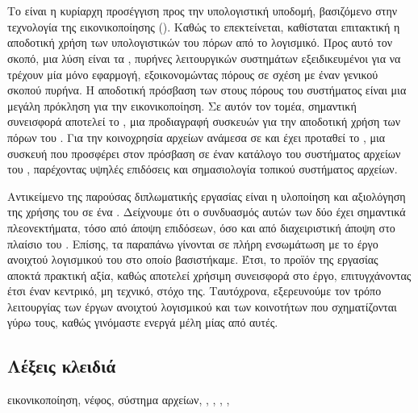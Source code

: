 \chapter*{\abstractname}

Το  είναι η κυρίαρχη προσέγγιση προς την υπολογιστική
υποδομή, βασιζόμενο στην τεχνολογία της εικονικοποίησης ().
Καθώς το  επεκτείνεται, καθίσταται επιτακτική η αποδοτική χρήση των
υπολογιστικών του πόρων από το λογισμικό. Προς αυτό τον σκοπό, μια λύση είναι τα
\emph{}, πυρήνες λειτουργικών συστημάτων εξειδικευμένοι για να
τρέχουν μία μόνο εφαρμογή, εξοικονομώντας πόρους σε σχέση με έναν γενικού σκοπού
πυρήνα. Η αποδοτική πρόσβαση των  στους πόρους του
\host{} συστήματος είναι μια μεγάλη πρόκληση για την εικονικοποίηση. Σε αυτόν
τον τομέα, σημαντική συνεισφορά αποτελεί το \emph{}, μια προδιαγραφή
 συσκευών για την αποδοτική χρήση των πόρων του \host{}.
Για την κοινοχρησία αρχείων ανάμεσα σε \host{} και \guest{} έχει προταθεί το
\emph{\viofs{}}, μια  συσκευή που προσφέρει στον \guest{} πρόσβαση σε
έναν κατάλογο του συστήματος αρχείων του \host{}, παρέχοντας υψηλές επιδόσεις
και σημασιολογία τοπικού συστήματος αρχείων.

Αντικείμενο της παρούσας διπλωματικής εργασίας είναι η υλοποίηση και αξιολόγηση
της χρήσης του \viofs{} σε ένα . Δείχνουμε ότι ο συνδυασμός αυτών
των δύο έχει σημαντικά πλεονεκτήματα, τόσο από άποψη επιδόσεων, όσο και από
διαχειριστική άποψη στο πλαίσιο του . Επίσης, τα παραπάνω γίνονται
σε πλήρη ενσωμάτωση με το έργο ανοιχτού λογισμικού του  στο οποίο
βασιστήκαμε. Έτσι, το προϊόν της εργασίας αποκτά πρακτική αξία, καθώς αποτελεί
χρήσιμη συνεισφορά στο έργο, επιτυγχάνοντας έτσι έναν κεντρικό, μη τεχνικό,
στόχο της. Ταυτόχρονα, εξερευνούμε τον τρόπο λειτουργίας των έργων ανοιχτού
λογισμικού και των κοινοτήτων που σχηματίζονται γύρω τους, καθώς γινόμαστε
ενεργά μέλη μίας από αυτές.

\section*{Λέξεις κλειδιά}
\noindent
εικονικοποίηση, νέφος, σύστημα αρχείων, , , \osv{},
\viofs{}, \qemu{}
